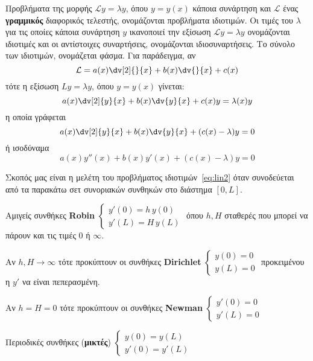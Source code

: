 Προβλήματα της μορφής $ \mathcal{L} y= \lambda y $, όπου $ y=y(x) $ κάποια συνάρτηση 
και $ \mathcal{L} $ ένας \textbf{γραμμικός} διαφορικός τελεστής, ονομάζονται 
\textcolor{Col1}{προβλήματα ιδιοτιμών}. Οι τιμές του $ \lambda $ για τις οποίες κάποια 
συνάρτηση $ y $ ικανοποιεί την εξίσωση $ \mathcal{L} y= \lambda y $ ονομάζονται 
\textcolor{Col1}{ιδιοτιμές} και οι αντίστοιχες συναρτήσεις, ονομάζονται 
\textcolor{Col1}{ιδιοσυναρτήσεις}. Το σύνολο των ιδιοτιμών, ονομάζεται
\textcolor{Col1}{φάσμα}. Για παράδειγμα, αν
\[
  \mathcal{L} = a(x) \dv[2]{}{x} + b(x) \dv{}{x} + c(x ) 
\] 
τότε η εξίσωση $ Ly= \lambda y $, όπου $ y=y(x) $ γίνεται:
\[
  a(x) \dv[2]{y}{x} + b(x) \dv{y}{x} + c(x) y = \lambda (x) y 
\]
η οποία γράφεται
\[
  a(x) \dv[2]{y}{x} + b(x) \dv{y}{x} + (c(x)- \lambda )y = 0
\] 
ή ισοδύναμα
\begin{equation}\label{eq:lin2}
  a(x) y''(x) + b(x) y'(x) + (c(x)- \lambda )y = 0 
\end{equation} 

Σκοπός μας είναι η μελέτη του προβλήματος ιδιοτιμών~\eqref{eq:lin2} όταν συνοδεύεται από 
τα παρακάτω σετ συνοριακών συνθηκών στο διάστημα $ [0,L] $.
\begin{myitemize}
  \item Αμιγείς συνθήκες \textbf{Robin} 
    $ 
    \begin{cases}
      y'(0)=h\, y(0) \\
      y'(L)=H\, y(L) 
    \end{cases}
    $ 
    όπου $ h,H $ σταθερές που μπορεί να πάρουν και τις τιμές 0 ή $ \infty $.
    \begin{myitemize}
      \item Αν $ h,H \to \infty $ τότε προκύπτουν οι συνθήκες \textbf{Dirichlet}  
        $ 
        \begin{cases}
          y(0)=0 \\
          y(L)=0
        \end{cases}
        $
        προκειμένου η $ y' $ να είναι πεπερασμένη.
      \item Αν $ h=H=0 $ τότε προκύπτουν οι συνθήκες \textbf{Newman} 
        $ 
        \begin{cases}
          y'(0)=0 \\
          y'(L)=0
        \end{cases}
        $
    \end{myitemize}
  \item Περιοδικές συνθήκες (\textbf{μικτές})
    $ \begin{cases}
      y(0)=y(L) \\
      y'(0)=y'(L)
    \end{cases}$
\end{myitemize}

